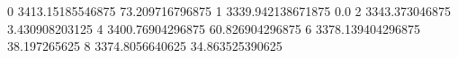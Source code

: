 0 3413.15185546875 73.209716796875
1 3339.942138671875 0.0
2 3343.373046875 3.430908203125
4 3400.76904296875 60.826904296875
6 3378.139404296875 38.197265625
8 3374.8056640625 34.863525390625
